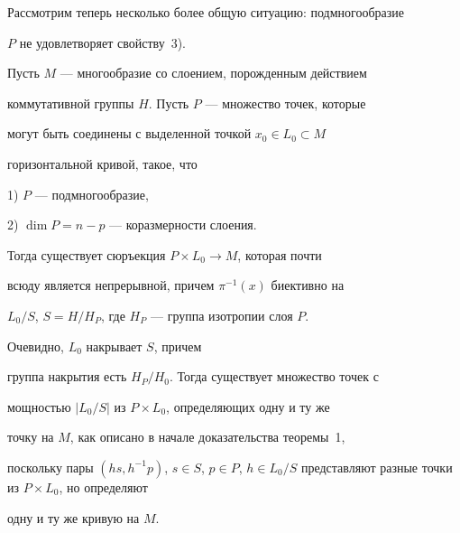 Рассмотрим теперь несколько более общую ситуацию: подмногообразие


$P$ не удовлетворяет свойству~3).





\begin{cornonum}


Пусть $M$ --- многообразие со слоением, порожденным действием


коммутативной группы $H$. Пусть $P$ --- множество точек, которые


могут быть соединены с выделенной точкой $x_0 \in L_0 \subset M$


горизонтальной кривой, такое, что





1) $P$ --- подмногообразие,





2) $\dim P=n-p$ --- коразмерности слоения.





Тогда существует сюръекция $P \times L_0 \to M$, которая почти


всюду является непрерывной, причем $\pi^{-1}(x)$ биективно на


$L_0/S$, $S=H/H_P$, где $H_P$ --- группа изотропии слоя $P$.


\end{cornonum}





\begin{pf}


Очевидно, $L_0$ накрывает $S$, причем


группа накрытия есть $H_P/H_0$. Тогда существует множество точек с


мощностью $|L_0/S|$ из $P \times L_0$, определяющих одну и ту же


точку на $M$, как описано в начале доказательства теоремы~1,


поскольку пары $(h s, h^{-1} p)$, $s \in S$, $p \in P$, $h \in


L_0/S$ представляют разные точки из $P \times L_0$, но определяют


одну и ту же кривую на $M$.


\end{pf}





